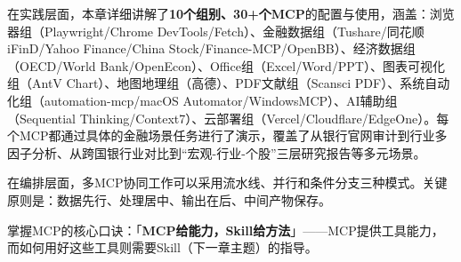 在实践层面，本章详细讲解了\textbf{10个组别、30+个MCP}的配置与使用，涵盖：浏览器组（Playwright/Chrome DevTools/Fetch）、金融数据组（Tushare/同花顺iFinD/Yahoo Finance/China Stock/Finance-MCP/OpenBB）、经济数据组（OECD/World Bank/OpenEcon）、Office组（Excel/Word/PPT）、图表可视化组（AntV Chart）、地图地理组（高德）、PDF文献组（Scansci PDF）、系统自动化组（automation-mcp/macOS Automator/WindowsMCP）、AI辅助组（Sequential Thinking/Context7）、云部署组（Vercel/Cloudflare/EdgeOne）。每个MCP都通过具体的金融场景任务进行了演示，覆盖了从银行官网审计到行业多因子分析、从跨国银行业对比到“宏观-行业-个股”三层研究报告等多元场景。

在编排层面，多MCP协同工作可以采用流水线、并行和条件分支三种模式。关键原则是：数据先行、处理居中、输出在后、中间产物保存。

掌握MCP的核心口诀：「\textbf{MCP给能力，Skill给方法}」——MCP提供工具能力，而如何用好这些工具则需要Skill（下一章主题）的指导。




